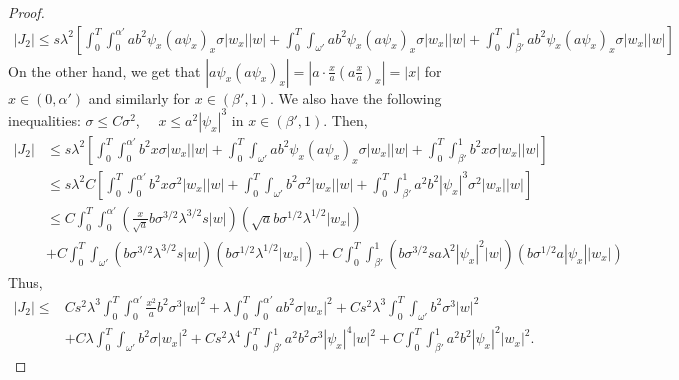 \documentclass[11pt,oneside,a4papper]{osajnl}
\begin{document}
\begin{proof}
    \begin{multline*}
    \left|J_2 \right|\leq s\lambda^2\left[\int_0^T \int_0^{\alpha'} ab^2 \psi_x (a\psi_x)_x \sigma |w_x| |w| +  \int_0^T\int_{\omega'} ab^2 \psi_x (a\psi_x)_x \sigma |w_x| |w| + \int_0^T \int_{\beta'}^1 ab^2 \psi_x (a\psi_x)_x \sigma |w_x| |w|\right]
    \end{multline*}
    On the other hand, we get that $\left| a\psi_x (a\psi_x)_x  \right|=\left| a\cdot \frac{x}{a}\left( a\frac{x}{a} \right)_x \right|=|x|$ for $x\in (0,\alpha')$ and similarly for $x\in (\beta',1)$. We also have the following inequalities: $\sigma\leq C\sigma^2$, \ \ $x\leq a^2|\psi_x|^3$ in $x\in (\beta',1)$. Then,
    \begin{equation*}
    \begin{split}
    \left|J_2 \right| &\leq s\lambda^2\left[\int_0^T \int_0^{\alpha'} b^2 x \sigma |w_x| |w| +  \int_0^T\int_{\omega'} ab^2 \psi_x (a\psi_x)_x \sigma |w_x| |w| + \int_0^T \int_{\beta'}^1 b^2 x \sigma |w_x| |w|\right] \\
    &\leq s\lambda^2 C \left[\int_0^T \int_0^{\alpha'} b^2 x \sigma^2 |w_x| |w| +  \int_0^T\int_{\omega'} b^2  \sigma^2 |w_x| |w| + \int_0^T \int_{\beta'}^1 a^2b^2|\psi_x|^3 \sigma^2 |w_x| |w|\right] \\
    &\leq C \int_0^T \int_0^{\alpha'} \left( \frac{x}{\sqrt{a}}b\sigma^{3/2}\lambda^{3/2}s|w|\right)\left( \sqrt{a}b\sigma^{1/2}\lambda^{1/2}|w_x| \right) \\
    &+C\int_0^T\int_{\omega'} \left( b\sigma^{3/2}\lambda^{3/2}s|w|\right)\left( b\sigma^{1/2}\lambda^{1/2}|w_x| \right)
		+C\int_0^T \int_{\beta'}^1\left( b\sigma^{3/2}sa\lambda^2|\psi_x|^2|w|\right)\left( b\sigma^{1/2}a|\psi_x||w_x| \right)
    \end{split}    
    \end{equation*}
    Thus,
    \begin{equation*}
    \begin{split}
        \left|J_2 \right| \leq &Cs^2\lambda^3\int_0^T \int_0^{\alpha'}\frac{x^2}{a}b^2\sigma^3|w|^2+\lambda\int_0^T \int_0^{\alpha'}ab^2\sigma|w_x|^2+Cs^2\lambda^3\int_0^T\int_{\omega'}b^2\sigma^3|w|^2\\
		&+C\lambda \int_0^T\int_{\omega'}b^2\sigma|w_x|^2
		+Cs^2\lambda^4\int_0^T \int_{\beta'}^1a^2b^2\sigma^3|\psi_x|^4|w|^2+C\int_0^T \int_{\beta'}^1a^2b^2|\psi_x|^2|w_x|^2.    
    \end{split}    
    \end{equation*}


\end{proof}
\end{document}
